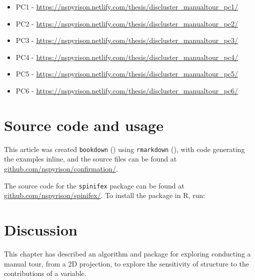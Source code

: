 \documentclass{monashthesis}
\begin{document}
\begin{itemize}
\tightlist
\item
  PC1 - \url{https://nspyrison.netlify.com/thesis/discluster_manualtour_pc1/}
\item
  PC2 - \url{https://nspyrison.netlify.com/thesis/discluster_manualtour_pc2/}
\item
  PC3 - \url{https://nspyrison.netlify.com/thesis/discluster_manualtour_pc3/}
\item
  PC4 - \url{https://nspyrison.netlify.com/thesis/discluster_manualtour_pc4/}
\item
  PC5 - \url{https://nspyrison.netlify.com/thesis/discluster_manualtour_pc5/}
\item
  PC6 - \url{https://nspyrison.netlify.com/thesis/discluster_manualtour_pc6/}
\end{itemize}

\hypertarget{source-code-and-usage}{%
\section{Source code and usage}\label{source-code-and-usage}}

This article was created \texttt{bookdown} (\textcite{xie_bookdown:_2016}) using \texttt{rmarkdown} (\textcite{xie_r_2018}), with code generating the examples inline, and the source files can be found at \href{https://github.com/nspyrison/confirmation/}{github.com/nspyrison/confirmation/}.

The source code for the \texttt{spinifex} package can be found at \href{https://github.com/nspyrison/spinifex/}{github.com/nspyrison/spinifex/}. To install the package in R, run:

\begin{Shaded}
\begin{Highlighting}[]
\OperatorTok{::}\NormalTok{(}\NormalTok{)}
\end{Highlighting}
\end{Shaded}

\hypertarget{discussion}{%
\section{Discussion}\label{discussion}}

This chapter has described an algorithm and package for exploring conducting a manual tour, from a 2D projection, to explore the sensitivity of structure to the contributions of a variable.
\end{document}
